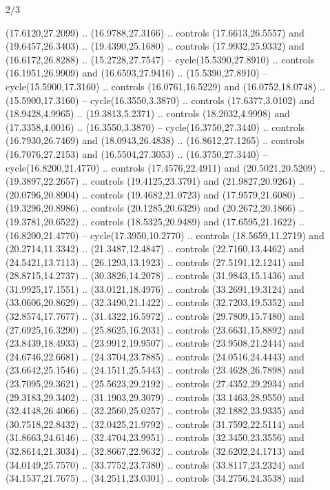\begin{flagdescription}{2/3}
\begin{scope}[yshift=\flagwidth,scale=\flagwidth/1241.93737]
\begin{scope}[y=-1mm, x=1mm,draw=gold,fill=blue,line join=miter,miter limit=4,line width=1.8\lw]
\begin{scope}[y=1mm, x=1mm, yscale=-1,shift={(573.68mm+\str,145.75)}]
\begin{scope}[scale=1.35,shift={(-9,-3)}]
\begin{scope}[scale=0.55]
\begin{scope}[scale=1.333]
    (17.6120,27.2099) .. (16.9788,27.3166) .. controls (17.6613,26.5557) and
    (19.6457,26.3403) .. (19.4390,25.1680) .. controls (17.9932,25.9332) and
    (16.6172,26.8288) .. (15.2728,27.7547) -- cycle(15.5390,27.8910) .. controls
    (16.1951,26.9909) and (16.6593,27.9416) .. (15.5390,27.8910) --
    cycle(15.5900,17.3160) .. controls (16.0761,16.5229) and (16.0752,18.0748) ..
    (15.5900,17.3160) -- cycle(16.3550,3.3870) .. controls (17.6377,3.0102) and
    (18.9428,4.9965) .. (19.3813,5.2371) .. controls (18.2032,4.9998) and
    (17.3358,4.0016) .. (16.3550,3.3870) -- cycle(16.3750,27.3440) .. controls
    (16.7930,26.7469) and (18.0943,26.4838) .. (16.8612,27.1265) .. controls
    (16.7076,27.2153) and (16.5504,27.3053) .. (16.3750,27.3440) --
    cycle(16.8200,21.4770) .. controls (17.4576,22.4911) and (20.5021,20.5209) ..
    (19.3897,22.2657) .. controls (19.4125,23.3791) and (21.9827,20.9264) ..
    (20.0796,20.8904) .. controls (19.4682,21.0723) and (17.9579,21.6080) ..
    (19.3296,20.8986) .. controls (20.1285,20.6329) and (20.2672,20.1866) ..
    (19.3781,20.6522) .. controls (18.5325,20.9489) and (17.6595,21.1622) ..
    (16.8200,21.4770) -- cycle(17.3950,10.2770) .. controls (18.5659,11.2719) and
    (20.2714,11.3342) .. (21.3487,12.4847) .. controls (22.7160,13.4462) and
    (24.5421,13.7113) .. (26.1293,13.1923) .. controls (27.5191,12.1241) and
    (28.8715,14.2737) .. (30.3826,14.2078) .. controls (31.9843,15.1436) and
    (31.9925,17.1551) .. (33.0121,18.4976) .. controls (33.2691,19.3124) and
    (33.0606,20.8629) .. (32.3490,21.1422) .. controls (32.7203,19.5352) and
    (32.8574,17.7677) .. (31.4322,16.5972) .. controls (29.7809,15.7480) and
    (27.6925,16.3290) .. (25.8625,16.2031) .. controls (23.6631,15.8892) and
    (23.8439,18.4933) .. (23.9912,19.9507) .. controls (23.9508,21.2444) and
    (24.6746,22.6681) .. (24.3704,23.7885) .. controls (24.0516,24.4443) and
    (23.6642,25.1546) .. (24.1511,25.5443) .. controls (23.4628,26.7898) and
    (23.7095,29.3621) .. (25.5623,29.2192) .. controls (27.4352,29.2934) and
    (29.3183,29.3402) .. (31.1903,29.3079) .. controls (33.1463,28.9550) and
    (32.4148,26.4066) .. (32.2560,25.0257) .. controls (32.1882,23.9335) and
    (30.7518,22.8432) .. (32.0425,21.9792) .. controls (31.7592,22.5114) and
    (31.8663,24.6146) .. (32.4704,23.9951) .. controls (32.3450,23.3556) and
    (32.8614,21.3034) .. (32.8667,22.9632) .. controls (32.6202,24.1713) and
    (34.0149,25.7570) .. (33.7752,23.7380) .. controls (33.8117,23.2324) and
    (34.1537,21.7675) .. (34.2511,23.0301) .. controls (34.2756,24.3538) and

\end{scope}
\end{scope}
\end{scope}
\end{scope}
\end{scope}
\end{scope}
\end{flagdescription}
